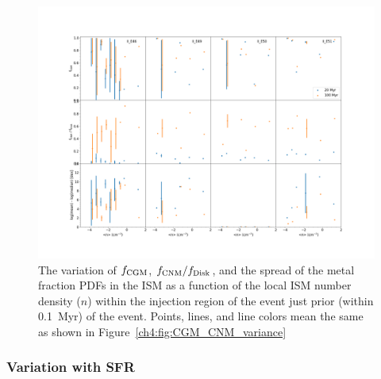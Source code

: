  \begin{figure}
   \centering
   \includegraphics[angle=90,width=0.99\linewidth]{figures/ch4/II_n_dependence}
   \caption{The variation of $f_{\rm CGM}$, $f_{\rm CNM} / f_{\rm Disk}$, and the spread of the metal fraction PDFs in the ISM as a function of the local ISM number density ($n$) within the injection region of the event just prior (within 0.1~Myr) of the event. Points, lines, and line colors mean the same as shown in Figure~\ref{ch4:fig:CGM_CNM_variance}}
   \label{ch4:fig:ISM_variance}
 \end{figure}


\subsubsection{Variation with SFR}
\label{ch4:sec:SFR}

